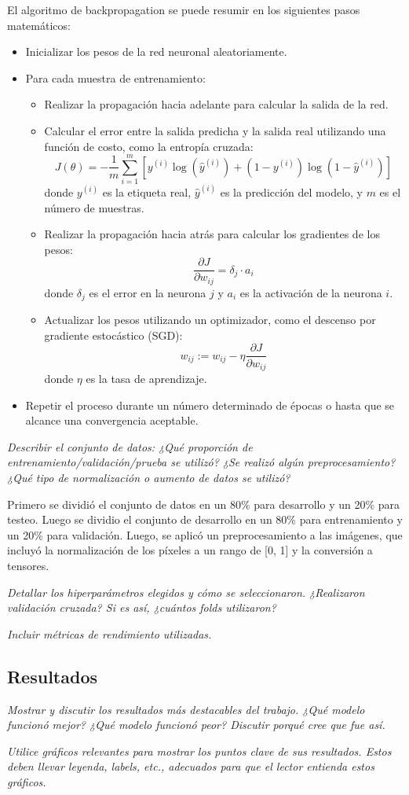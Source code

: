 \documentclass[11pt]{article}
\begin{document}
El algoritmo de backpropagation se puede resumir en los siguientes pasos matemáticos:
\begin{itemize}
    \item Inicializar los pesos de la red neuronal aleatoriamente.
    \item Para cada muestra de entrenamiento:
    \begin{itemize}
        \item Realizar la propagación hacia adelante para calcular la salida de la red.
        \item Calcular el error entre la salida predicha y la salida real utilizando una función de costo, como la entropía cruzada:
        \[
        J(\theta) = -\frac{1}{m} \sum_{i=1}^m \left[ y^{(i)} \log(\hat{y}^{(i)}) + (1 - y^{(i)}) \log(1 - \hat{y}^{(i)}) \right]
        \]
        donde \( y^{(i)} \) es la etiqueta real, \( \hat{y}^{(i)} \) es la predicción del modelo, y \( m \) es el número de muestras.
        \item Realizar la propagación hacia atrás para calcular los gradientes de los pesos:
        \[
        \frac{\partial J}{\partial w_{ij}} = \delta_j \cdot a_i
        \]
        donde \( \delta_j \) es el error en la neurona \( j \) y \( a_i \) es la activación de la neurona \( i \).
        \item Actualizar los pesos utilizando un optimizador, como el descenso por gradiente estocástico (SGD):
        \[
        w_{ij} := w_{ij} - \eta \frac{\partial J}{\partial w_{ij}}
        \]
        donde \( \eta \) es la tasa de aprendizaje.
    \end{itemize}
    \item Repetir el proceso durante un número determinado de épocas o hasta que se alcance una convergencia aceptable.
\end{itemize}


\textit{Describir el conjunto de datos: ¿Qué proporción de entrenamiento/validación/prueba se utilizó? ¿Se realizó algún preprocesamiento? ¿Qué tipo de normalización o aumento de datos se utilizó?}

Primero se dividió el conjunto de datos en un 80\% para desarrollo y un 20\% para testeo. Luego se dividio el conjunto de desarrollo en un 80\% para entrenamiento y un 20\% para validación. Luego, se aplicó un preprocesamiento a las imágenes, que incluyó la normalización de los píxeles a un rango de [0, 1] y la conversión a tensores. 

\textit{Detallar los hiperparámetros elegidos y cómo se seleccionaron. ¿Realizaron validación cruzada? Si es así, ¿cuántos folds utilizaron?}

\textit{Incluir métricas de rendimiento utilizadas.}


\subsection{Resultados}
\textit{Mostrar y discutir los resultados más destacables del trabajo. ¿Qué modelo funcionó mejor? ¿Qué modelo funcionó peor? Discutir porqué cree que fue así.}

\textit{Utilice gráficos relevantes para mostrar los puntos clave de sus resultados. Estos deben llevar leyenda, labels, etc., adecuados para que el lector entienda estos gráficos.}
\end{document}
